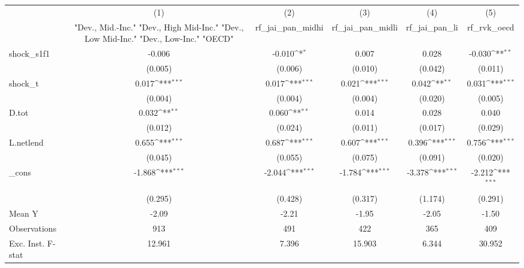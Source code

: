 {
\def\sym#1{\ifmmode^{#1}\else\(^{#1}\)\fi}
\begin{tabular}{l*{5}{c}}
\toprule
            &\multicolumn{1}{c}{(1)}&\multicolumn{1}{c}{(2)}&\multicolumn{1}{c}{(3)}&\multicolumn{1}{c}{(4)}&\multicolumn{1}{c}{(5)}\\
            &\multicolumn{1}{c}{ "Dev., Mid.-Inc." "Dev., High Mid-Inc." "Dev., Low Mid-Inc." "Dev., Low-Inc." "OECD" }&\multicolumn{1}{c}{rf\_jai\_pan\_midhi}&\multicolumn{1}{c}{rf\_jai\_pan\_midli}&\multicolumn{1}{c}{rf\_jai\_pan\_li}&\multicolumn{1}{c}{rf\_rvk\_oecd}\\
\midrule
shock\_s1f1  &      -0.006         &      -0.010\sym{*}  &       0.007         &       0.028         &      -0.030\sym{**} \\
            &     (0.005)         &     (0.006)         &     (0.010)         &     (0.042)         &     (0.011)         \\
\addlinespace
shock\_t     &       0.017\sym{***}&       0.017\sym{***}&       0.021\sym{***}&       0.042\sym{**} &       0.031\sym{***}\\
            &     (0.004)         &     (0.004)         &     (0.004)         &     (0.020)         &     (0.005)         \\
\addlinespace
D.tot       &       0.032\sym{**} &       0.060\sym{**} &       0.014         &       0.028         &       0.040         \\
            &     (0.012)         &     (0.024)         &     (0.011)         &     (0.017)         &     (0.029)         \\
\addlinespace
L.netlend   &       0.655\sym{***}&       0.687\sym{***}&       0.607\sym{***}&       0.396\sym{***}&       0.756\sym{***}\\
            &     (0.045)         &     (0.055)         &     (0.075)         &     (0.091)         &     (0.020)         \\
\addlinespace
\_cons      &      -1.868\sym{***}&      -2.044\sym{***}&      -1.784\sym{***}&      -3.378\sym{***}&      -2.212\sym{***}\\
            &     (0.295)         &     (0.428)         &     (0.317)         &     (1.174)         &     (0.291)         \\
\midrule
Mean Y      &       -2.09         &       -2.21         &       -1.95         &       -2.05         &       -1.50         \\
Observations&         913         &         491         &         422         &         365         &         409         \\
Exc. Inst. F-stat&      12.961         &       7.396         &      15.903         &       6.344         &      30.952         \\
\bottomrule
\end{tabular}
}
